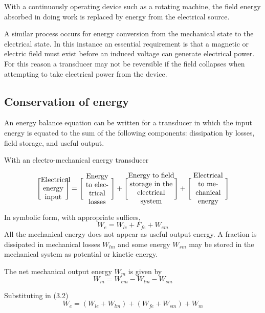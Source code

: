 \documentclass[a4paper,numbers=noenddot,12pt]{scrbook}
\begin{document}
With a continuously operating device such as a rotating machine, the field energy absorbed in doing work is replaced by energy from the electrical source.

A similar process occurs for energy conversion from the mechanical state to the electrical state. In this instance an essential requirement is that a magnetic or electric field must exist before an induced voltage can generate electrical power. For this reason a transducer may not be reversible if the field collapses when attempting to take electrical power from the device.

\subsection{Conservation of energy}
An energy balance equation can be written for a transducer in which the input energy is equated to the sum of the following components: dissipation by losses, field storage, and useful output.

With an electro-mechanical energy transducer

\begin{equation}
    \Bigg[
        \parbox{8ex}{\centering Electrical energy input}
    \Bigg]
    =
    \Bigg[
        \parbox{9ex}{\centering Energy to electrical losses}
    \Bigg]
    +
    \Bigg[
        \parbox{15ex}{\centering Energy to field storage in the electrical system}
    \Bigg]
    +
    \Bigg[
        \parbox{11ex}{\centering Electrical to mechanical energy}
    \Bigg]
    \label{eq:Eq3.1}
\end{equation}

In symbolic form, with appropriate suffices,
\begin{equation}
    W_e = W_{le} + F_{fe} +W_{em}
    \label{eq:Eq3.2}
\end{equation}
All the mechanical energy does not appear as useful output energy. A fraction is dissipated in mechanical losses $W_{lm}$ and some energy $W_{sm}$ may be stored in the mechanical system as potential or kinetic energy.

The net mechanical output energy $W_m$ is given by
\begin{equation}
    W_m = W_{em} - W_{lm} -W_{sm}
    \label{eq:Eq3.3}
\end{equation}

Substituting in (3.2)
\begin{equation}
    W_e = (W_{le} + W_{lm}) + (W_{fe} + W_{sm}) + W_m
    \label{eq:Eq.3-4}
\end{equation}
\end{document}
